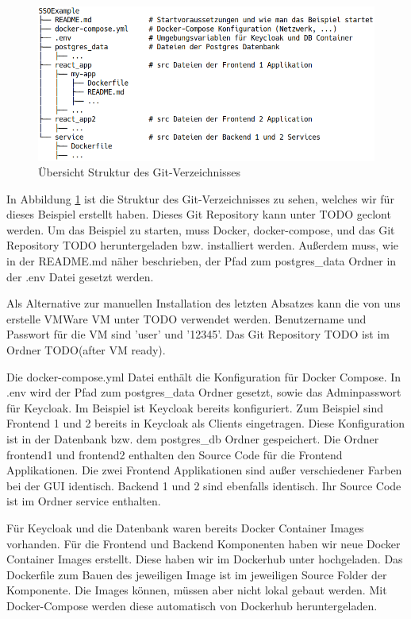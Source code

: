 \begin{figure}[!ht]
	\centering
	\includegraphics[width=1\textwidth]{Images/Ebert/srcDirectoryStructure.PNG}
	\caption{Übersicht Struktur des Git-Verzeichnisses}
	\label{fig:EB_Struktur des Git-Verzeichnisses}
\end{figure}

In Abbildung \ref{fig:EB_Struktur des Git-Verzeichnisses} ist die Struktur des Git-Verzeichnisses zu sehen, welches wir für dieses Beispiel erstellt haben. Dieses Git Repository kann unter TODO geclont werden. Um das Beispiel zu starten, muss Docker, docker-compose, und das Git Repository TODO heruntergeladen bzw. installiert werden. Außerdem muss, wie in der README.md näher beschrieben, der Pfad zum postgres\_data Ordner in der .env Datei gesetzt werden.

Als Alternative zur manuellen Installation des letzten Absatzes kann die von uns erstelle VMWare VM unter TODO verwendet werden. Benutzername und Passwort für die VM sind 'user' und '12345'. Das Git Repository TODO ist im Ordner TODO(after VM ready).

Die docker-compose.yml Datei enthält die Konfiguration für Docker Compose. In .env wird der Pfad zum postgres\_data Ordner gesetzt, sowie das Adminpasswort für Keycloak. Im Beispiel ist Keycloak bereits konfiguriert. Zum Beispiel sind Frontend 1 und 2 bereits in Keycloak als Clients eingetragen. Diese Konfiguration ist in der Datenbank bzw. dem postgres\_db Ordner gespeichert. Die Ordner frontend1 und frontend2 enthalten den Source Code für die Frontend Applikationen. Die zwei Frontend Applikationen sind außer verschiedener Farben bei der GUI identisch. Backend 1 und 2 sind ebenfalls identisch. Ihr Source Code ist im Ordner service enthalten. 

Für Keycloak und die Datenbank waren bereits Docker Container Images vorhanden. Für die Frontend und Backend Komponenten haben wir neue Docker Container Images erstellt. Diese haben wir im Dockerhub unter \cite{EB42} hochgeladen. Das Dockerfile zum Bauen des jeweiligen Image ist im jeweiligen Source Folder der Komponente. Die Images können, müssen aber nicht lokal gebaut werden. Mit Docker-Compose werden diese automatisch von Dockerhub heruntergeladen.

